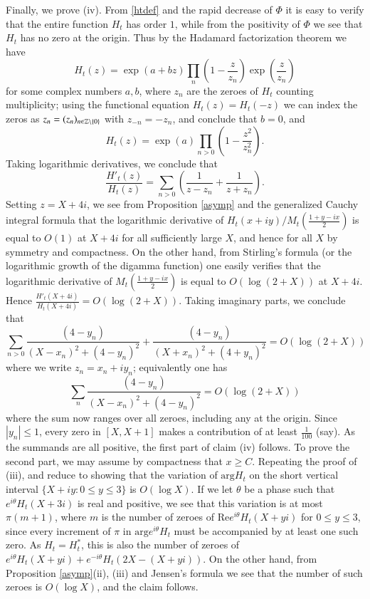 Finally, we prove (iv).  From \eqref{htdef} and the rapid decrease of $\Phi$ it is easy to verify that the entire function $H_t$ has order $1$, while from the positivity of $\Phi$ we see that $H_t$ has no zero at the origin.  Thus by the Hadamard factorization theorem we have
$$ H_t(z) = \exp(a+bz) \prod_n \left( 1 - \frac{z}{z_n} \right) \exp( \frac{z}{z_n} )$$
for some complex numbers $a,b$, where $z_n$ are the zeroes of $H_t$ counting multiplicity; using the functional equation $H_t(z) = H_t(-z)$ we can index the zeros as $z_n = (z_n)_{n \in \mathbb{Z} \backslash \{0\}}$ with $z_{-n} = -z_n$, and conclude that $b=0$, and
$$ H_t(z) = \exp(a) \prod_{n>0} \left( 1 - \frac{z^2}{z_n^2} \right).$$
Taking logarithmic derivatives, we conclude that
\begin{equation}\label{hata}
 \frac{H'_t(z)}{H_t(z)} = \sum_{n>0} \left(\frac{1}{z-z_n} + \frac{1}{z+z_n}\right).
\end{equation}
Setting $z = X+4i$, we see from Proposition \ref{asymp} and the generalized Cauchy integral formula that the logarithmic derivative of $H_t(x+iy)/M_t\left(\frac{1+y-ix}{2}\right)$ is equal to $O(1)$ at $X+4i$ for all sufficiently large $X$, and hence for all $X$ by symmetry and compactness.  On the other hand, from Stirling's formula (or the logarithmic growth of the digamma function) one easily verifies that the logarithmic derivative of $M_t\left(\frac{1+y-ix}{2}\right)$  is equal to $O( \log(2+X) )$ at $X+4i$.  Hence $\frac{H'_t(X+4i)}{H_t(X+4i)} = O(\log(2+X))$.  Taking imaginary parts, we conclude that
$$ \sum_{n>0} \frac{(4-y_n)}{(X-x_n)^2 + (4-y_n)^2} + \frac{(4-y_n)}{(X+x_n)^2 + (4+y_n)^2} = O(\log(2+X))$$
where we write $z_n = x_n + iy_n$; equivalently one has
$$ \sum_n \frac{(4-y_n)}{(X-x_n)^2 + (4-y_n)^2} = O(\log(2+X))$$
where the sum now ranges over all zeroes, including any at the origin. Since $|y_n| \leq 1$, every zero in $[X,X+1]$ makes a contribution of at least $\frac{1}{100}$ (say).  As the summands are all positive, the first part of claim (iv) follows.  To prove the second part, we may assume by compactness that $x \geq C$.  Repeating the proof of (iii), and reduce to showing that the variation of $\mathrm{arg} H_t$ on the short vertical interval $\{ X+iy: 0 \leq y \leq 3 \}$ is $O( \log X )$.  If we let $\theta$ be a phase such that $e^{i\theta} H_t(X+3i)$ is real and positive, we see that this variation is at most $\pi(m+1)$, where $m$ is the number of zeroes of $\mathrm{Re} e^{i\theta} H_t(X+yi)$ for $0 \leq y \leq 3$, since every increment of $\pi$ in $\mathrm{arg} e^{i\theta} H_t$ must be accompanied by at least one such zero.  As $H_t = H_t^*$, this is also the number of zeroes of $e^{i\theta} H_t(X+yi) + e^{-i\theta} H_t(2X - (X+yi))$.  On the other hand, from Proposition \ref{asymp}(ii), (iii) and Jensen's formula we see that the number of such zeroes is $O( \log X )$, and the claim follows.

